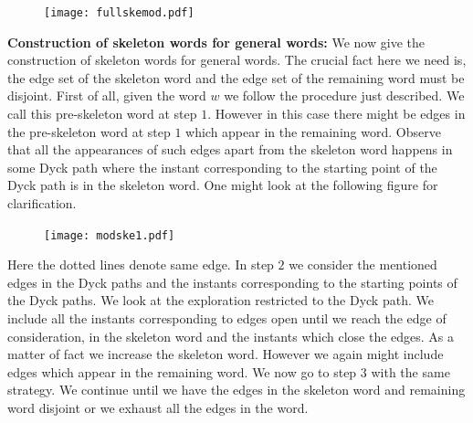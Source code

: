 \documentclass[12pt]{article}
\numberwithin{equation}{section}
\numberwithin{equation}{section}
\theoremstyle{definition}
\newtheorem{definition}{Definition}[section]
\renewcommand{\1}{\bf 1}
\begin{document}
\begin{figure}[H]
        \begin{center}
                \texttt{[image: fullskemod.pdf]}
        ~ %
      \end{center}   
 \end{figure} 
\textbf{Construction of skeleton words for general words:}
We now give the construction of skeleton words for general words. The crucial fact here we need is, the edge set of the skeleton word and the edge set of the remaining word must be disjoint. First of all, given the word $w$ we follow the procedure just described. We call this pre-skeleton word at step $1$. However in this case there might be edges in the pre-skeleton word at step $1$ which appear in the remaining word. Observe that all the appearances of such edges apart from the skeleton word happens in some Dyck path where the instant corresponding to the starting point of the Dyck path is in the skeleton word. One might look at the following figure for clarification.
\begin{figure}[H]
        \begin{center}
                \texttt{[image: modske1.pdf]}
        ~ %
      \end{center}   
 \end{figure} 
 Here the dotted lines denote same edge.
 In step $2$ we consider the mentioned edges in the Dyck paths and the instants corresponding to the starting points of the Dyck paths. We look at the exploration restricted to the Dyck path. We include all the instants corresponding to edges open until we reach the edge of consideration, in the skeleton word and the instants which close the edges. As a matter of fact we increase the skeleton word. However we again might include edges  which appear in the remaining word. We now go to step $3$ with the same strategy. We continue until we have the edges in the skeleton word and remaining word disjoint or we exhaust all the edges in the word.
\end{document}
